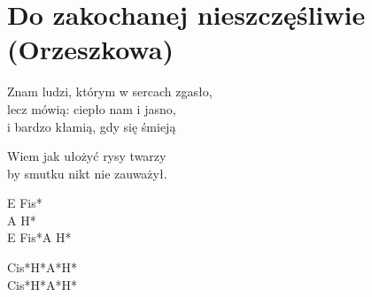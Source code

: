 \section{Do zakochanej nieszczęśliwie \\ (Orzeszkowa)}
\begin{text}
Znam ludzi, którym w sercach zgasło,\\
lecz mówią: ciepło nam i jasno,\\
i bardzo kłamią, gdy się śmieją

Wiem jak ułożyć rysy twarzy\\
by smutku nikt nie zauważył.
\end{text}
\begin{chord}
E Fis*\\
A H*\\
E Fis*A H*

Cis*H*A*H*\\
Cis*H*A*H*
\end{chord}